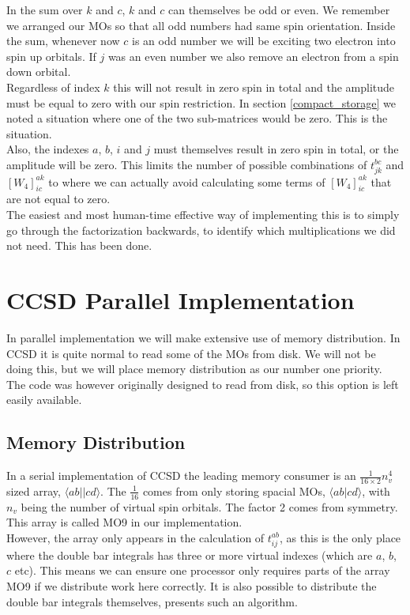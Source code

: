 \documentclass[a4paper,norsk,11pt,twoside]{report}
\begin{document}
In the sum over $k$ and $c$, $k$ and $c$ can themselves be odd or even. We remember we arranged our MOs so that all odd numbers had same spin orientation. Inside the sum, whenever now $c$ is an odd number we will be exciting two electron into spin up orbitals. If $j$ was an even number we also remove an electron from a spin down orbital. \\

Regardless of index $k$ this will not result in zero spin in total and the amplitude must be equal to zero with our spin restriction. In section \ref{compact_storage} we noted a situation where one of the two sub-matrices would be zero. This is the situation. \\

Also, the indexes $a$, $b$, $i$ and $j$ must themselves result in zero spin in total, or the amplitude will be zero. This limits the number of possible combinations of $t_{jk}^{bc}$ and $[W_4]_{ic}^{ak}$ to where we can actually avoid calculating some terms of $[W_4]_{ic}^{ak}$ that are not equal to zero. \\

The easiest and most human-time effective way of implementing this is to simply go through the factorization backwards, to identify which multiplications we did not need. This has been done.

\section{CCSD Parallel Implementation}
In parallel implementation we will make extensive use of memory
distribution. In CCSD it is quite normal to read some of the MOs from
disk. We will not be doing this, but we will place memory distribution
as our number one priority. The code was however originally designed
to read from disk, so this option is left easily available.

\subsection{Memory Distribution}
In a serial implementation of CCSD the leading memory consumer is an $\frac{1}{16 \times 2} n_v^4$ sized array, $\langle ab||cd \rangle$. The $\frac{1}{16}$ comes from only storing spacial MOs, $\langle ab|cd \rangle$, with $n_v$ being the number of virtual spin orbitals. The factor 2 comes from symmetry. This array is called MO9 in our implementation. \\

However, the array only appears in the calculation of $t_{ij}^{ab}$, as this is the only place where the double bar integrals has three or more virtual indexes (which are $a$, $b$, $c$ etc). This means we can ensure one processor only requires parts of the array MO9 if we distribute work here correctly. It is also possible to distribute the double bar integrals themselves, \cite{ccsd_minne_distribuert_double_bar_artikkel} presents such an algorithm. \\
\end{document}
